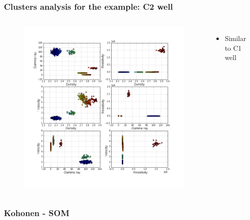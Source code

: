 \documentclass[aspectratio=10]{beamer} %
\begin{document}
\begin{frame}
\frametitle{Clusters analysis for the example: C2 well}

     \begin{columns}
     	\footnotesize
     	\justifying
     	\begin{figure}
     		\includegraphics[scale=0.268]{Imagens/cluterpocoC2.png}
     	\end{figure}
     	
     	\begin{itemize}
     		\footnotesize
     		\item Similar to C1 well
     	\end{itemize}
     	
     \end{columns}
\end{frame}

\subsubsection{Kohonen - SOM}
\end{document}
